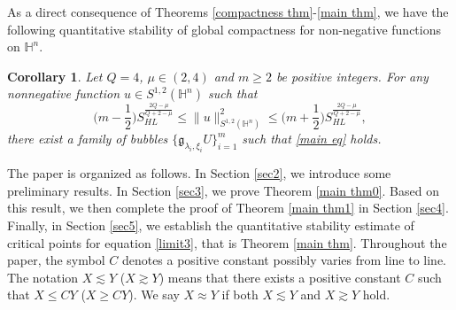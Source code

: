 \documentclass[11pt]{article}
\newtheorem{corollary}[theorem]{Corollary}
\begin{document}

As a direct consequence of Theorems \ref{compactness thm}-\ref{main thm}, we have the following quantitative stability of global compactness for non-negative functions on $\mathbb{H}^n$.
\begin{corollary}\label{cor1-1}
Let $Q=4$, $\mu\in(2,4)$ and $m\geq2$ be positive integers. For any nonnegative function $u\in S^{1,2}(\mathbb{H}^{n})$ such that
\begin{equation*}%
	\Big(m-\frac{1}{2}\Big)S_{HL}^{\frac{2Q-\mu}{Q+2-\mu}}\leq \|u\|_{S^{1,2}(\mathbb{H}^{n})}^{2}\leq \Big(m+\frac{1}{2}\Big)S_{HL}^{\frac{2Q-\mu}{Q+2-\mu}},
\end{equation*}
   there exist a family of bubbles $\big\{\mathfrak{g}_{\lambda_i , \xi_i } U\big\}_{i=1}^{m}$ such that \eqref{main eq} holds.
\end{corollary}

The paper is organized as follows. In Section
\ref{sec2}, we introduce some preliminary results. In Section \ref{sec3}, we prove Theorem \ref{main thm0}. Based on this result, we then complete the
proof of Theorem \ref{main thm1} in Section \ref{sec4}. Finally, in Section \ref{sec5}, we establish the quantitative stability estimate  of critical points for equation \eqref{limit3}, that is Theorem \ref{main thm}. Throughout the paper, the symbol $C$ denotes a positive constant possibly varies from line to line. The notation $X\lesssim Y$ ($X\gtrsim Y$) means that there exists a positive constant $C$ such that $X\leq CY$ ($X\geq CY$). We say $X \approx Y$ if both
$X\lesssim Y$ and $X\gtrsim Y$ hold.





\end{document}
